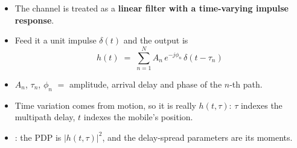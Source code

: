 {
\begin{itemize}
  \item The channel is treated as a \textbf{linear filter with a time-varying impulse response}.
  \item Feed it a unit impulse $\delta(t)$ and the output is
        \[ h(t) \;=\; \sum_{n=1}^{N} A_n\, e^{-j\phi_n}\,\delta(t-\tau_n) \]
  \item $A_n$, $\tau_n$, $\phi_n$ $=$ amplitude, arrival delay and phase of the $n$-th path.
  \item Time variation comes from motion, so it is really $h(t,\tau)$: $\tau$ indexes the
        multipath delay, $t$ indexes the mobile's position.
  \item {}: the PDP is
        $|h(t,\tau)|^2$, and the delay-spread parameters are its moments.
\end{itemize}}

